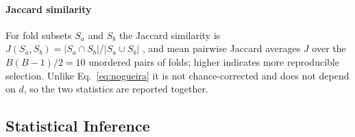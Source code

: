 \documentclass[final,5p,twocolumn]{elsarticle}
\begin{document}
\paragraph{Jaccard similarity}
For fold subsets $S_a$ and $S_b$ the Jaccard similarity is $J(S_a,S_b)=|S_a\cap S_b|/|S_a\cup S_b|$ \cite{jaccard1901}, and mean pairwise Jaccard averages $J$ over the $B(B-1)/2=10$ unordered pairs of folds; higher indicates more reproducible selection. Unlike Eq.~\eqref{eq:nogueira} it is not chance-corrected and does not depend on $d$, so the two statistics are reported together.

\subsection{Statistical Inference}
\label{subsec:inference}
\end{document}
